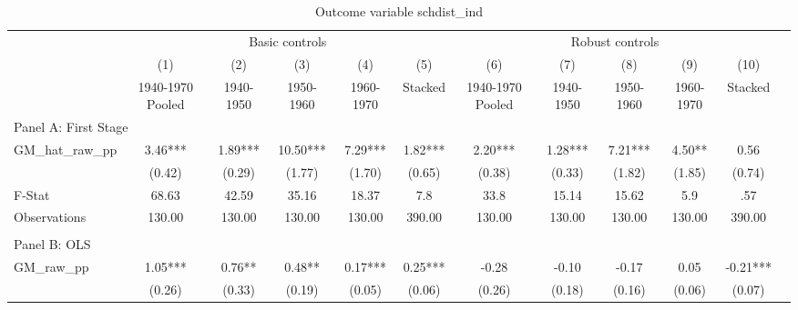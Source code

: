  \begin{table}[htbp]\centering {} \begin{threeparttable} \caption{Outcome variable schdist\_ind } \begin{tabular}{l*{11}{c}} \toprule
          &\multicolumn{5}{c}{Basic controls}                                   &\multicolumn{5}{c}{Robust controls}                                  \\\cmidrule(lr){2-6}\cmidrule(lr){7-11}
          &\multicolumn{1}{c}{(1)}&\multicolumn{1}{c}{(2)}&\multicolumn{1}{c}{(3)}&\multicolumn{1}{c}{(4)}&\multicolumn{1}{c}{(5)}&\multicolumn{1}{c}{(6)}&\multicolumn{1}{c}{(7)}&\multicolumn{1}{c}{(8)}&\multicolumn{1}{c}{(9)}&\multicolumn{1}{c}{(10)}\\
          &\multicolumn{1}{c}{1940-1970 Pooled}&\multicolumn{1}{c}{1940-1950}&\multicolumn{1}{c}{1950-1960}&\multicolumn{1}{c}{1960-1970}&\multicolumn{1}{c}{Stacked}&\multicolumn{1}{c}{1940-1970 Pooled}&\multicolumn{1}{c}{1940-1950}&\multicolumn{1}{c}{1950-1960}&\multicolumn{1}{c}{1960-1970}&\multicolumn{1}{c}{Stacked}\\
\cmidrule(lr){1-11}
\multicolumn{10}{l}{Panel A: First Stage}\\
\cmidrule(lr){1-11}
GM\_hat\_raw\_pp&      3.46***&      1.89***&     10.50***&      7.29***&      1.82***&      2.20***&      1.28***&      7.21***&      4.50** &      0.56   \\
          &    (0.42)   &    (0.29)   &    (1.77)   &    (1.70)   &    (0.65)   &    (0.38)   &    (0.33)   &    (1.82)   &    (1.85)   &    (0.74)   \\
\midrule
F-Stat    &     68.63   &     42.59   &     35.16   &     18.37   &       7.8   &      33.8   &     15.14   &     15.62   &       5.9   &       .57   \\
Observations&    130.00   &    130.00   &    130.00   &    130.00   &    390.00   &    130.00   &    130.00   &    130.00   &    130.00   &    390.00   \\
\cmidrule[\heavyrulewidth](lr){1-11} \\ \cmidrule[\heavyrulewidth](lr){1-11}
\multicolumn{10}{l}{Panel B: OLS}\\
\cmidrule(lr){1-11}
GM\_raw\_pp &      1.05***&      0.76** &      0.48** &      0.17***&      0.25***&     -0.28   &     -0.10   &     -0.17   &      0.05   &     -0.21***\\
          &    (0.26)   &    (0.33)   &    (0.19)   &    (0.05)   &    (0.06)   &    (0.26)   &    (0.18)   &    (0.16)   &    (0.06)   &    (0.07)   \\

\end{tabular}
\end{threeparttable}
\end{table}

